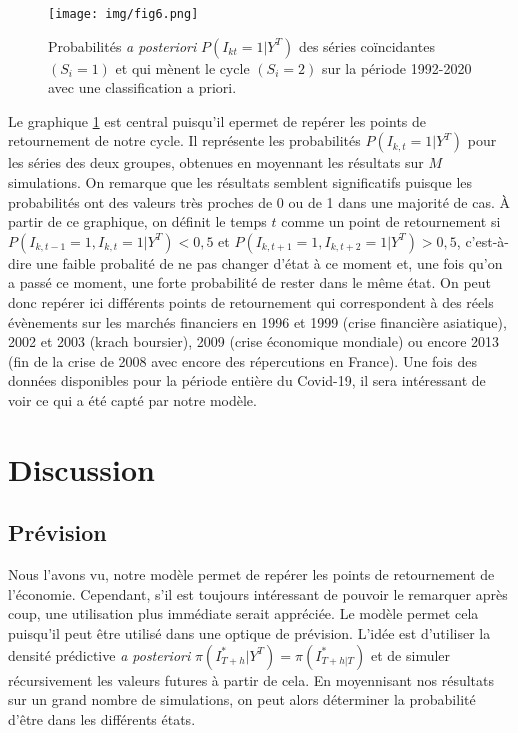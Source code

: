 \documentclass[10pt,french,french]{article}
\begin{document}
\begin{figure}
\centering
\texttt{[image: img/fig6.png]}
\caption{Probabilités \textit{a posteriori} $P(I_{kt}=1|Y^T)$ des séries coïncidantes $(S_i=1)$ et qui mènent le cycle $(S_i=2)$ sur la période 1992-2020 avec une classification a priori.}
\label{retournements}
\end{figure}

Le graphique \ref{retournements} est central puisqu'il epermet de repérer les points de retournement de notre cycle.
Il représente les probabilités \(P(I_{k,t} = 1|Y^T)\) pour les séries des deux groupes, obtenues en moyennant les résultats sur \(M\) simulations.
On remarque que les résultats semblent significatifs puisque les probabilités ont des valeurs très proches de 0 ou de 1 dans une majorité de cas.
À partir de ce graphique, on définit le temps \(t\) comme un point de retournement si \(P(I_{k,t-1} = 1, I_{k,t} = 1 | Y^T) < 0,5\) et \(P(I_{k,t+1} = 1, I_{k,t+2} = 1 | Y^T) > 0,5\), c'est-à-dire une faible probalité de ne pas changer d'état à ce moment et, une fois qu'on a passé ce moment, une forte probabilité de rester dans le même état.
On peut donc repérer ici différents points de retournement qui correspondent à des réels évènements sur les marchés financiers en 1996 et 1999 (crise financière asiatique), 2002 et 2003 (krach boursier), 2009 (crise économique mondiale) ou encore 2013 (fin de la crise de 2008 avec encore des répercutions en France).
Une fois des données disponibles pour la période entière du Covid-19, il sera intéressant de voir ce qui a été capté par notre modèle.

\hypertarget{discussion}{%
\section{Discussion}\label{discussion}}

\hypertarget{pruxe9vision}{%
\subsection{Prévision}\label{pruxe9vision}}

Nous l'avons vu, notre modèle permet de repérer les points de retournement de l'économie.
Cependant, s'il est toujours intéressant de pouvoir le remarquer après coup, une utilisation plus immédiate serait appréciée.
Le modèle permet cela puisqu'il peut être utilisé dans une optique de prévision.
L'idée est d'utiliser la densité prédictive \emph{a posteriori} \(\pi(I^*_{T+h}|Y^T) = \pi(I^*_{T+h|T})\) et de simuler récursivement les valeurs futures à partir de cela.
En moyennisant nos résultats sur un grand nombre de simulations, on peut alors déterminer la probabilité d'être dans les différents états.
\end{document}
